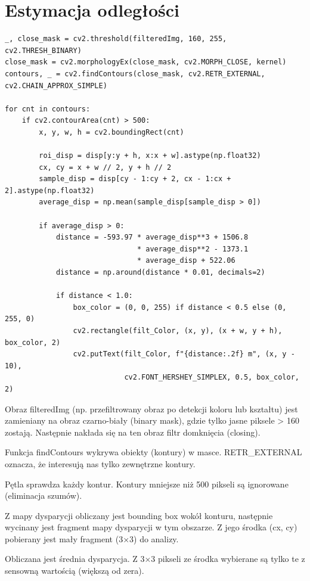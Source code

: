\documentclass[magisterska]{pracadypl}
\begin{document}
\section{Estymacja odległości}

\begin{lstlisting}[style=mypython]
_, close_mask = cv2.threshold(filteredImg, 160, 255, cv2.THRESH_BINARY)
close_mask = cv2.morphologyEx(close_mask, cv2.MORPH_CLOSE, kernel)
contours, _ = cv2.findContours(close_mask, cv2.RETR_EXTERNAL, cv2.CHAIN_APPROX_SIMPLE)

for cnt in contours:
    if cv2.contourArea(cnt) > 500:
        x, y, w, h = cv2.boundingRect(cnt)

        roi_disp = disp[y:y + h, x:x + w].astype(np.float32)
        cx, cy = x + w // 2, y + h // 2
        sample_disp = disp[cy - 1:cy + 2, cx - 1:cx + 2].astype(np.float32)
        average_disp = np.mean(sample_disp[sample_disp > 0])

        if average_disp > 0:
            distance = -593.97 * average_disp**3 + 1506.8 
                               * average_disp**2 - 1373.1 
                               * average_disp + 522.06
            distance = np.around(distance * 0.01, decimals=2)

            if distance < 1.0:
                box_color = (0, 0, 255) if distance < 0.5 else (0, 255, 0)
                cv2.rectangle(filt_Color, (x, y), (x + w, y + h), box_color, 2)
                cv2.putText(filt_Color, f"{distance:.2f} m", (x, y - 10),
                            cv2.FONT_HERSHEY_SIMPLEX, 0.5, box_color, 2)
\end{lstlisting}

Obraz filteredImg (np. przefiltrowany obraz po detekcji koloru lub kształtu) jest zamieniany na obraz czarno-biały (binary mask), gdzie tylko jasne piksele > 160 zostają. Następnie nakłada się na ten obraz filtr domknięcia (closing).

Funkcja findContours wykrywa obiekty (kontury) w masce. RETR\_EXTERNAL oznacza, że interesują nas tylko zewnętrzne kontury.

Pętla sprawdza każdy kontur. Kontury mniejsze niż 500 pikseli są ignorowane (eliminacja szumów).

Z mapy dysparycji obliczany jest bounding box wokół konturu, następnie wycinany jest fragment mapy dysparycji w tym obszarze. Z jego środka (cx, cy) pobierany jest mały fragment (3×3) do analizy.

Obliczana jest średnia dysparycja. Z 3×3 pikseli ze środka wybierane są tylko te z sensowną wartością (większą od zera).
\end{document}
